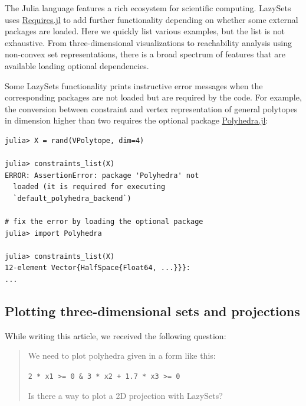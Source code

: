 The Julia language features a rich ecosystem for scientific computing.
%
LazySets uses \href{https://github.com/JuliaPackaging/Requires.jl}{Requires.jl} to add further functionality depending on whether some external packages are loaded.
%
Here we quickly list various examples, but the list is not exhaustive.
%
From three-dimensional visualizations to reachability analysis using non-convex set representations, there is a broad spectrum of features that are available loading optional dependencies.

\smallskip

Some LazySets functionality prints instructive error messages when the corresponding packages are not loaded but are required by the code. For example, the conversion between constraint and vertex representation of general polytopes in dimension higher than two requires the optional package \href{https://github.com/JuliaPolyhedra/Polyhedra.jl}{Polyhedra.jl}:

\begin{minipage}{\linewidth}
\vspace{-\abovedisplayskip}
\begin{lstlisting}
julia> X = rand(VPolytope, dim=4)
	
julia> constraints_list(X)
ERROR: AssertionError: package 'Polyhedra' not
  loaded (it is required for executing
  `default_polyhedra_backend`)

# fix the error by loading the optional package
julia> import Polyhedra

julia> constraints_list(X)
12-element Vector{HalfSpace{Float64, ...}}}:
...
	\end{lstlisting}
\end{minipage}


\subsection{Plotting three-dimensional sets and projections}

While writing this article, we received the following question:

\begin{quote}
We need to plot polyhedra given in a form like this:

\begin{center}
	\texttt{2 * x1 >= 0 \& 3 * x2 + 1.7 * x3 >= 0}
\end{center}

Is there a way to plot a 2D projection with LazySets?
\end{quote}

